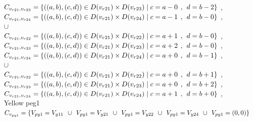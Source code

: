 \\$C_{v_{r21},v_{r23}}=\{((a,b),(c,d))\in D(v_{r21}) \times D(v_{r23})\mid c = a - 0\hspace{1ex} , \hspace{1ex}  d = b - 2 \}$ , 
\\$C_{v_{r21},v_{r24}}=\{((a,b),(c,d))\in D(v_{r21}) \times D(v_{r24})\mid c = a - 1\hspace{1ex} , \hspace{1ex}  d = b - 0 \}$ , 
\\$\cup$
\\$C_{v_{r21},v_{r22}}=\{((a,b),(c,d))\in D(v_{r21}) \times D(v_{r22})\mid c = a + 1\hspace{1ex} , \hspace{1ex}  d = b - 0 \}$ , 
\\$C_{v_{r21},v_{r23}}=\{((a,b),(c,d))\in D(v_{r21}) \times D(v_{r23})\mid c = a + 2\hspace{1ex} , \hspace{1ex}  d = b - 0 \}$ , 
\\$C_{v_{r21},v_{r24}}=\{((a,b),(c,d))\in D(v_{r21}) \times D(v_{r24})\mid c = a + 0\hspace{1ex} , \hspace{1ex}  d = b - 1 \}$ , 
\\$\cup$
\\$C_{v_{r21},v_{r22}}=\{((a,b),(c,d))\in D(v_{r21}) \times D(v_{r22})\mid c = a + 0\hspace{1ex} , \hspace{1ex}  d = b + 1 \}$ , 
\\$C_{v_{r21},v_{r23}}=\{((a,b),(c,d))\in D(v_{r21}) \times D(v_{r23})\mid c = a + 0\hspace{1ex} , \hspace{1ex}  d = b + 2 \}$ , 
\\$C_{v_{r21},v_{r24}}=\{((a,b),(c,d))\in D(v_{r21}) \times D(v_{r24})\mid c = a + 1\hspace{1ex} , \hspace{1ex}  d = b + 0 \}$ , 
\\ Yellow peg1 
\\$C_{v_{py1}}= \{V_{py1}=V_{y11} \hspace{1ex} \cup \hspace{1ex} V_{py1}=V_{y21} \hspace{1ex} \cup \hspace{1ex} V_{py1}=V_{y22} \hspace{1ex} \cup \hspace{1ex} V_{py1}=V_{y24} \hspace{1ex}\cup\hspace{1ex} V_{py1}=(0,0) \}$
